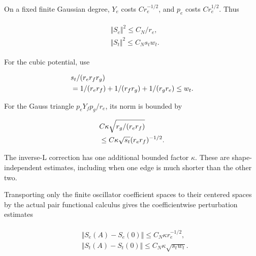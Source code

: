 On a fixed finite Gaussian degree, \(Y_{e}\) costs \(C r_{e}^{-1/2}\),
and \(p_{e}\) costs \(C r_{e}^{1/2}\). Thus

\begin{gather*}
\begin{aligned}
& \Vert S_{e}\Vert ^{2} \le  C_{N}/r_{e}, \\
& \Vert S_{t}\Vert ^{2} \le  C_{N} s_{t} w_{t}.
\end{aligned}\tag{3.2}
\end{gather*}

For the cubic potential, use

\begin{gather*}
\begin{aligned}
& s_{t}/(r_{e} r_{f} r_{g}) \\
& =1/(r_{e} r_{f})+1/(r_{f} r_{g})+1/(r_{g} r_{e}) \le  w_{t}.
\end{aligned}\notag
\end{gather*}

For the Gauss triangle \(p_{e} Y_{f} p_{g}/r_{e}\), its norm is bounded
by

\begin{gather*}
\begin{aligned}
& C \kappa  \sqrt{r_{g}/(r_{e} r_{f})} \\
& \le  C \kappa  \sqrt{s_{t}} (r_{e} r_{f})^{-1/2}.
\end{aligned}\notag
\end{gather*}

The inverse-L correction has one additional bounded factor \(\kappa\).
These are shape-independent estimates, including when one edge is much
shorter than the other two.

Transporting only the finite oscillator coefficient spaces to their
centered spaces by the actual pair functional calculus gives the
coefficientwise perturbation estimates

\begin{gather*}
\begin{aligned}
& \Vert S_{e}(A)-S_{e}(0)\Vert  \le  C_{N} \kappa  r_{e}^{-1/2}, \\
& \Vert S_{t}(A)-S_{t}(0)\Vert  \le  C_{N} \kappa  \sqrt{s_{t} w_{t}}.
\end{aligned}\tag{3.3}
\end{gather*}

